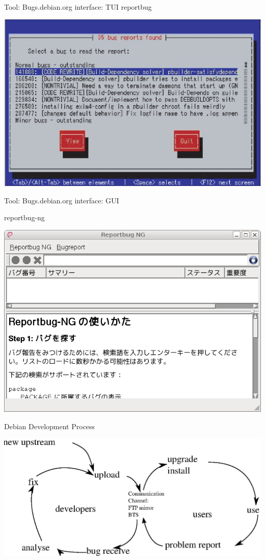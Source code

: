 \documentclass[cjk,dvipdfm,12pt]{beamer}
\begin{document}
\begin{frame}{Tool: Bugs.debian.org interface: TUI}
reportbug

 \includegraphics[width=1\hsize]{image200508/reportbug.eps}
\end{frame}

\begin{frame}{Tool: Bugs.debian.org interface: GUI}

reportbug-ng

 \includegraphics[width=1\hsize]{image200805/reportbug-ng.png}
\end{frame}

\begin{frame}{Debian Development Process}

 \includegraphics[width=1\hsize]{image200805/develcycle.eps} 

\end{frame}
\end{document}
